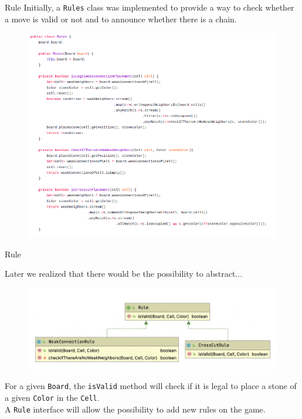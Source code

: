\documentclass{beamer}
\begin{document}
\begin{frame}{Rule}
	Initially, a \texttt{Rules} class was implemented to provide a way to check whether a move is valid or not and to announce whether there is a chain.
	\begin{figure}
		\includegraphics[scale=0.28]{images/rules-class.png}
	\end{figure}
\end{frame}

\begin{frame}{Rule}
	
	Later we realized that there would be the possibility to abstract...
	\begin{figure}
		\includegraphics[scale=0.4]{images/rules-uml.jpg}
	\end{figure}

	For a given \texttt{Board}, the \texttt{isValid} method will check if it is legal to place a stone of a given \texttt{Color} in the \texttt{Cell}. \\
	\vspace{0.1cm}
	A \texttt{Rule} interface will allow the possibility to add new rules on the game.
	
\end{frame}
\end{document}
